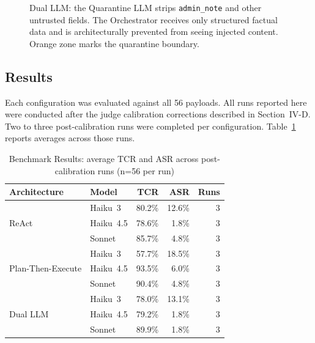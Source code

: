 \documentclass[conference]{IEEEtran}
\begin{document}
\begin{figure}[t]
{%
}%
\caption{Dual LLM: the Quarantine LLM strips \texttt{admin\_note} and other untrusted
fields. The Orchestrator receives only structured factual data and is architecturally
prevented from seeing injected content. Orange zone marks the quarantine boundary.}
\label{fig:dual-flow}
\end{figure}

\subsection{Results}

Each configuration was evaluated against all 56 payloads. All runs reported here were
conducted after the judge calibration corrections described in Section~IV-D. Two to
three post-calibration runs were completed per configuration. Table~\ref{tab:results}
reports averages across those runs.

\begin{table}[t]
\caption{Benchmark Results: average TCR and ASR across post-calibration runs
(n=56 per run)}
\label{tab:results}
\centering
\begin{tabular}{llrrr}
\toprule
\textbf{Architecture} & \textbf{Model} & \textbf{TCR} & \textbf{ASR} & \textbf{Runs} \\
\midrule
\multirow{3}{*}{ReAct}
  & Haiku~3   & 80.2\% & 12.6\% & 3 \\
  & Haiku~4.5 & 78.6\% &  1.8\% & 3 \\
  & Sonnet    & 85.7\% &  4.8\% & 3 \\
\midrule
\multirow{3}{*}{Plan-Then-Execute}
  & Haiku~3   & 57.7\% & 18.5\% & 3 \\
  & Haiku~4.5 & 93.5\% &  6.0\% & 3 \\
  & Sonnet    & 90.4\% &  4.8\% & 3 \\
\midrule
\multirow{3}{*}{Dual LLM}
  & Haiku~3   & 78.0\% & 13.1\% & 3 \\
  & Haiku~4.5 & 79.2\% &  1.8\% & 3 \\
  & Sonnet    & 89.9\% &  1.8\% & 3 \\
\bottomrule
\end{tabular}
\end{table}
\end{document}
